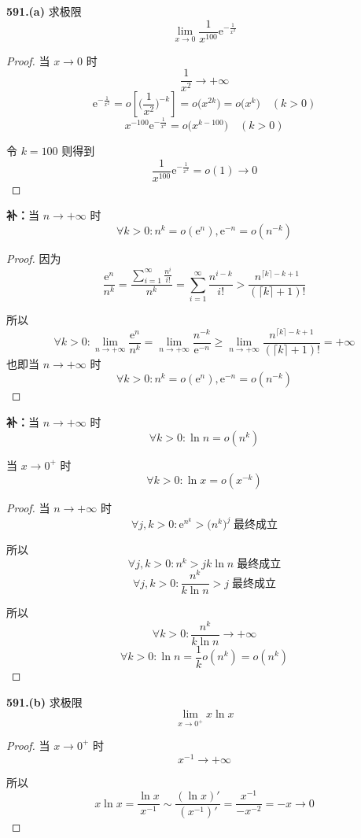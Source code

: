 \textbf{591.(a)} 求极限
\[\lim_{x \rightarrow 0} \frac{1}{x^{100}} \mathrm{e}^{-\frac{1}{x^2}}\]
\begin{proof}
    当 $x \rightarrow 0$ 时
    \[\frac{1}{x^2} \rightarrow +\infty\]
    \[\mathrm{e}^{-\frac{1}{x^2}} = o\left[\biggl(\frac{1}{x^2}\biggr)^{-k}\right] = o\bigl(x^{2k}\bigr) = o\bigl(x^k\bigr) \quad (k>0)\]
    \[x^{-100}\mathrm{e}^{-\frac{1}{x^2}} = o\bigl(x^{k-100}\bigr) \quad (k>0)\]

    令 $k = 100$ 则得到
    \[\frac{1}{x^{100}} \mathrm{e}^{-\frac{1}{x^2}} = o(1) \rightarrow 0\]
\end{proof}

\textbf{补：}当 $n \rightarrow +\infty$ 时
\[\forall k > 0: n^k = o(\mathrm{e}^n), \mathrm{e}^{-n} = o(n^{-k})\]
\begin{proof}
    因为
    \[\frac{\mathrm{e}^n}{n^k} = \frac{\displaystyle \sum_{i=1}^{\infty} \frac{n^i}{i!}}{n^k} = \sum_{i=1}^{\infty} \frac{n^{i-k}}{i!} > \frac{n^{\lceil k \rceil -k+1}}{(\lceil k \rceil+1)!}\]

    所以
    \[\forall k > 0: \lim_{n \rightarrow +\infty} \frac{\mathrm{e}^n}{n^k} = \lim_{n \rightarrow +\infty} \frac{n^{-k}}{\mathrm{e}^{-n}} \geqslant \lim_{n \rightarrow +\infty} \frac{n^{\lceil k \rceil - k+1}}{(\lceil k \rceil+1)!} = +\infty\]
    也即当 $n \rightarrow +\infty$ 时
    \[\forall k > 0: n^k = o(\mathrm{e}^n), \mathrm{e}^{-n} = o(n^{-k})\]
\end{proof}

\textbf{补：}当 $n \rightarrow +\infty$ 时
\[\forall k > 0: \ln n = o(n^k)\]

当 $x \rightarrow 0^+$ 时
\[\forall k > 0: \ln x = o(x^{-k})\]
\begin{proof}
    当 $n \rightarrow +\infty$ 时
    \[\forall j,k > 0: \mathrm{e}^{n^k} > \bigl(n^k\bigr)^j \;\text{最终成立}\]

    所以
    \[\forall j,k > 0: n^k > jk\ln n \;\text{最终成立}\]
    \[\forall j,k > 0: \frac{n^k}{k\ln n} > j \;\text{最终成立}\]

    所以
    \[\forall k > 0: \frac{n^k}{k\ln n} \rightarrow +\infty\]
    \[\forall k > 0: \ln n = \frac{1}{k} o(n^k) = o(n^k)\]
\end{proof}
\vspace{9pt}

\textbf{591.(b)} 求极限
\[\lim_{x \rightarrow 0^+} x\ln x\]

\begin{proof}
    当 $x \rightarrow 0^+$ 时
    \[x^{-1} \rightarrow +\infty\]
    
    所以
    \[x \ln x = \frac{\ln x}{x^{-1}} \sim \frac{(\ln x)'}{(x^{-1})'} = \frac{x^{-1}}{-x^{-2}} = -x \rightarrow 0\]
\end{proof}\vspace{9pt}


